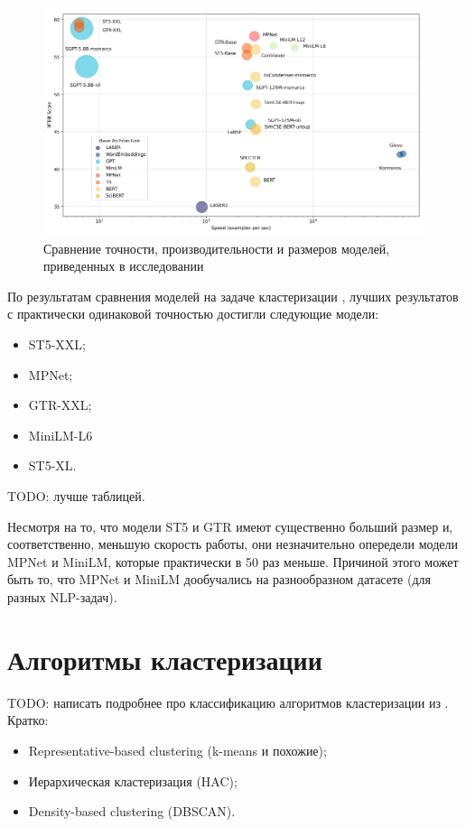 \begin{figure}[h]
    \centering
    \includegraphics[width=\linewidth]{images/mteb-models.png}
    \caption{Сравнение точности, производительности и размеров моделей, приведенных в исследовании \cite{mteb}}
    \label{img:mteb_models}
\end{figure}

По результатам сравнения моделей на задаче кластеризации \cite{mteb}, лучших результатов с практически одинаковой точностью достигли следующие модели:
\begin{itemize}
    \item ST5-XXL;
    \item MPNet;
    \item GTR-XXL;
    \item MiniLM-L6
    \item ST5-XL.
\end{itemize}
TODO: лучше таблицей.

Несмотря на то, что модели ST5 и GTR имеют существенно больший размер и, соответственно, меньшую скорость работы, они незначительно опередели модели MPNet и MiniLM, которые практически в 50 раз меньше. Причиной этого может быть то, что MPNet и MiniLM дообучались на разнообразном датасете (для разных NLP-задач).

\section{Алгоритмы кластеризации}

TODO: написать подробнее про классификацию алгоритмов кластеризации из \cite{no-patterns}.
Кратко:
\begin{itemize}
    \item Representative-based clustering (k-means и похожие);
    \item Иерархическая кластеризация (HAC);
    \item Density-based clustering (DBSCAN).
\end{itemize}

